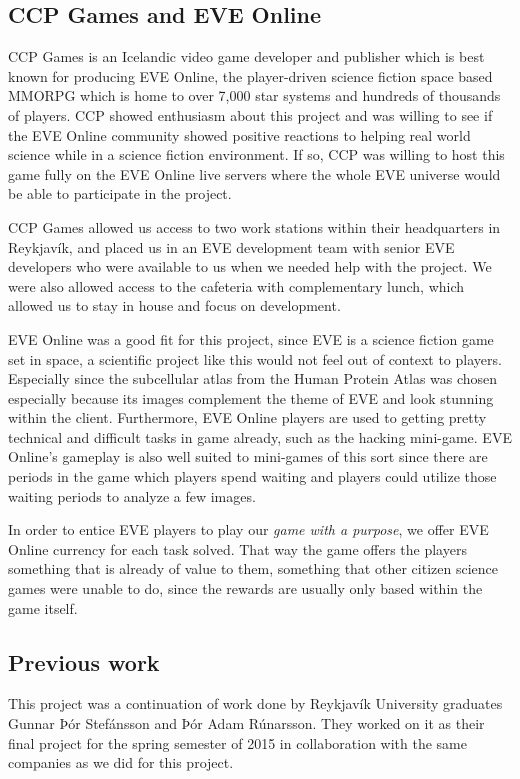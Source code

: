 \subsection{CCP Games and EVE Online}

	CCP Games \cite{CCP} is an Icelandic video game developer and publisher which is best known for producing EVE Online, the player-driven science fiction space based MMORPG which is home to over 7,000 star systems and hundreds of thousands of players. CCP showed enthusiasm about this project and was willing to see if the EVE Online community showed positive reactions to helping real world science while in a science fiction environment. If so, CCP was willing to host this game fully on the EVE Online live servers where the whole EVE universe would be able to participate in the project.

	CCP Games allowed us access to two work stations within their headquarters in Reykjavík, and placed us in an EVE development team with senior EVE developers who were available to us when we needed help with the project. We were also allowed access to the cafeteria with complementary lunch, which allowed us to stay in house and focus on development.

	EVE Online was a good fit for this project, since EVE is a science fiction game set in space, a scientific project like this would not feel out of context to players. Especially since the subcellular atlas from the Human Protein Atlas was chosen especially because its images complement the theme of EVE and look stunning within the client. Furthermore, EVE Online players are used to getting pretty technical and difficult tasks in game already, such as the hacking mini-game. EVE Online's gameplay is also well suited to mini-games of this sort since there are periods in the game which players spend waiting and players could utilize those waiting periods to analyze a few images.

	In order to entice EVE players to play our \emph{game with a purpose}, we offer EVE Online currency for each task solved. That way the game offers the players something that is already of value to them, something that other citizen science games were unable to do, since the rewards are usually only based within the game itself.


\subsection{Previous work}
	This project was a continuation of work done by Reykjavík University graduates Gunnar Þór Stefánsson and Þór Adam Rúnarsson. They worked on it as their final project for the spring semester of 2015 in collaboration with the same companies as we did for this project.

